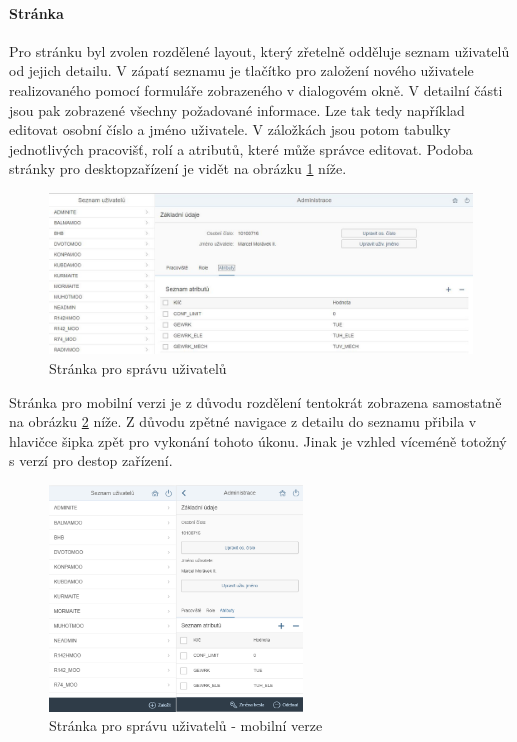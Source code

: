\documentclass[thesis=M,czech]{FITthesis}[2012/06/26]
\begin{document}
\paragraph{Stránka}
Pro stránku byl zvolen rozdělené layout, který zřetelně odděluje seznam uživatelů od jejich detailu. V zápatí seznamu je tlačítko pro založení nového uživatele realizovaného pomocí formuláře zobrazeného v dialogovém okně. V detailní části jsou pak zobrazené všechny požadované informace. Lze tak tedy například editovat osobní číslo a jméno uživatele. V záložkách jsou potom tabulky jednotlivých pracovišť, rolí a atributů, které může správce editovat. Podoba stránky pro desktopzařízení je vidět na obrázku \ref{img:view_administrace} níže.
\begin{figure}[H]
	\centering
	\includegraphics[width=1\textwidth]{images/view_administrace}
	\caption{Stránka pro správu uživatelů}
	\label{img:view_administrace}
\end{figure}	
Stránka pro mobilní verzi je z důvodu rozdělení tentokrát zobrazena samostatně na obrázku \ref{img:view_administrace_mob} níže. Z důvodu zpětné navigace z detailu do seznamu přibila v hlavičce šipka zpět pro vykonání tohoto úkonu. Jinak je vzhled víceméně totožný s verzí pro destop zařízení.  
\begin{figure}[H]
	\centering
	\includegraphics[width=0.6\textwidth]{images/view_administrace_mob}
	\caption{Stránka pro správu uživatelů - mobilní verze}
	\label{img:view_administrace_mob}
\end{figure}	
\end{document}
